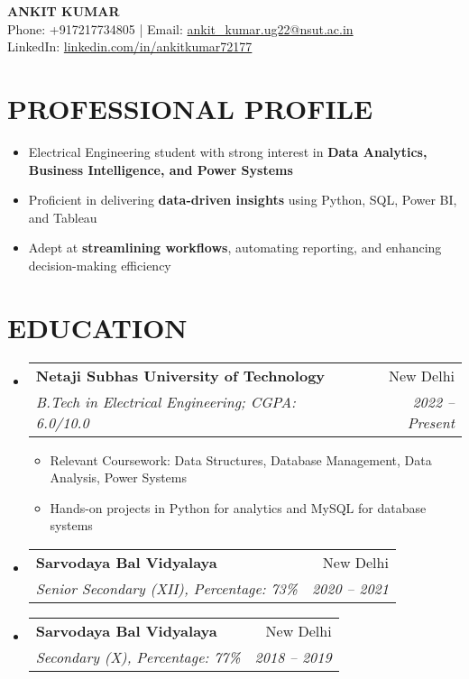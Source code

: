 \documentclass[11pt,a4paper]{article}
\makeatletter
\newcommand{\resumeItem}[1]{\item\small{#1}}
\newcommand{\resumeSubheading}[4]{
  \item
  \begin{tabular*}{\textwidth}{l@{\extracolsep{\fill}}r}
    \textbf{#1} & #2 \\
    \textit{#3} & \textit{#4} \\
  \end{tabular*}
}
\makeatother
\begin{document}
\pagestyle{empty}

\begin{center}
    {\LARGE \textbf{ANKIT KUMAR}}\\[5pt]
    Phone: +917217734805 | 
    Email: \href{mailto:ankit_kumar.ug22@nsut.ac.in}{ankit\_kumar.ug22@nsut.ac.in}\\
    LinkedIn: \href{https://www.linkedin.com/in/ankitkumar72177/}{linkedin.com/in/ankitkumar72177}
\end{center}

\section{PROFESSIONAL PROFILE}
\begin{itemize}[leftmargin=0.15in, label={}]
    \resumeItem{Electrical Engineering student with strong interest in \textbf{Data Analytics, Business Intelligence, and Power Systems}}
    \resumeItem{Proficient in delivering \textbf{data-driven insights} using Python, SQL, Power BI, and Tableau}
    \resumeItem{Adept at \textbf{streamlining workflows}, automating reporting, and enhancing decision-making efficiency}
\end{itemize}

\section{EDUCATION}
\begin{itemize}[leftmargin=0.15in, label={}]
  \resumeSubheading
    {Netaji Subhas University of Technology}{New Delhi}
    {B.Tech in Electrical Engineering; CGPA: 6.0/10.0}{2022 -- Present}
    \begin{itemize}
        \resumeItem{Relevant Coursework: Data Structures, Database Management, Data Analysis, Power Systems}
        \resumeItem{Hands-on projects in Python for analytics and MySQL for database systems}
    \end{itemize}
  \resumeSubheading
    {Sarvodaya Bal Vidyalaya}{New Delhi}
    {Senior Secondary (XII), Percentage: 73\%}{2020 -- 2021}
  \resumeSubheading
    {Sarvodaya Bal Vidyalaya}{New Delhi}
    {Secondary (X), Percentage: 77\%}{2018 -- 2019}
\end{itemize}

\end{document}

